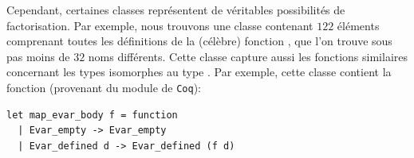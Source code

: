Cependant, certaines classes représentent de véritables possibilités de factorisation. Par exemple, nous trouvons une classe contenant $122$ éléments comprenant toutes les définitions de la (célèbre) fonction , que l'on trouve sous pas moins de $32$ noms différents. Cette classe capture aussi les fonctions similaires concernant les types isomorphes au type . Par exemple, cette classe contient la fonction  (provenant du module  de \verb|Coq|):

\begin{verbatim}
let map_evar_body f = function
  | Evar_empty -> Evar_empty
  | Evar_defined d -> Evar_defined (f d)
\end{verbatim}
